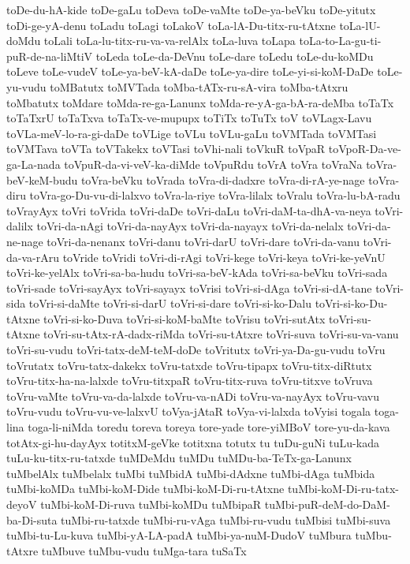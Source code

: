 {toDe-du-hA-kide
toDe-gaLu
toDeva
toDe-vaMte
toDe-ya-beVku
toDe-yitutx
toDi-ge-yA-denu
toLadu
toLagi
toLakoV
toLa-lA-Du-titx-ru-tAtxne
toLa-lU-doMdu
toLali
toLa-lu-titx-ru-va-va-relAlx
toLa-luva
toLapa
toLa-to-La-gu-ti-puR-de-na-liMtiV
toLeda
toLe-da-DeVnu
toLe-dare
toLedu
toLe-du-koMDu
toLeve
toLe-vudeV
toLe-ya-beV-kA-daDe
toLe-ya-dire
toLe-yi-si-koM-DaDe
toLe-yu-vudu
toMBatutx
toMVTada
toMba-tATx-ru-sA-vira
toMba-tAtxru
toMbatutx
toMdare
toMda-re-ga-Lanunx
toMda-re-yA-ga-bA-ra-deMba
toTaTx
toTaTxrU
toTaTxva
toTaTx-ve-mupupx
toTiTx
toTuTx
toV
toVLagx-Lavu
toVLa-meV-lo-ra-gi-daDe
toVLige
toVLu
toVLu-gaLu
toVMTada
toVMTasi
toVMTava
toVTa
toVTakekx
toVTasi
toVhi-nali
toVkuR
toVpaR
toVpoR-Da-ve-ga-La-nada
toVpuR-da-vi-veV-ka-diMde
toVpuRdu
toVrA
toVra
toVraNa
toVra-beV-keM-budu
toVra-beVku
toVrada
toVra-di-dadxre
toVra-di-rA-ye-nage
toVra-diru
toVra-go-Du-vu-di-lalxvo
toVra-la-riye
toVra-lilalx
toVralu
toVra-lu-bA-radu
toVrayAyx
toVri
toVrida
toVri-daDe
toVri-daLu
toVri-daM-ta-dhA-va-neya
toVri-dalilx
toVri-da-nAgi
toVri-da-nayAyx
toVri-da-nayayx
toVri-da-nelalx
toVri-da-ne-nage
toVri-da-nenanx
toVri-danu
toVri-darU
toVri-dare
toVri-da-vanu
toVri-da-va-rAru
toVride
toVridi
toVri-di-rAgi
toVri-kege
toVri-keya
toVri-ke-yeVnU
toVri-ke-yelAlx
toVri-sa-ba-hudu
toVri-sa-beV-kAda
toVri-sa-beVku
toVri-sada
toVri-sade
toVri-sayAyx
toVri-sayayx
toVrisi
toVri-si-dAga
toVri-si-dA-tane
toVri-sida
toVri-si-daMte
toVri-si-darU
toVri-si-dare
toVri-si-ko-Dalu
toVri-si-ko-Du-tAtxne
toVri-si-ko-Duva
toVri-si-koM-baMte
toVrisu
toVri-sutAtx
toVri-su-tAtxne
toVri-su-tAtx-rA-dadx-riMda
toVri-su-tAtxre
toVri-suva
toVri-su-va-vanu
toVri-su-vudu
toVri-tatx-deM-teM-doDe
toVritutx
toVri-ya-Da-gu-vudu
toVru
toVrutatx
toVru-tatx-dakekx
toVru-tatxde
toVru-tipapx
toVru-titx-diRtutx
toVru-titx-ha-na-lalxde
toVru-titxpaR
toVru-titx-ruva
toVru-titxve
toVruva
toVru-vaMte
toVru-va-da-lalxde
toVru-va-nADi
toVru-va-nayAyx
toVru-vavu
toVru-vudu
toVru-vu-ve-lalxvU
toVya-jAtaR
toVya-vi-lalxda
toVyisi
togala
toga-lina
toga-li-niMda
toredu
toreva
toreya
tore-yade
tore-yiMBoV
tore-yu-da-kava
totAtx-gi-hu-dayAyx
totitxM-geVke
totitxna
totutx
tu
tuDu-guNi
tuLu-kada
tuLu-ku-titx-ru-tatxde
tuMDeMdu
tuMDu
tuMDu-ba-TeTx-ga-Lanunx
tuMbelAlx
tuMbelalx
tuMbi
tuMbidA
tuMbi-dAdxne
tuMbi-dAga
tuMbida
tuMbi-koMDa
tuMbi-koM-Dide
tuMbi-koM-Di-ru-tAtxne
tuMbi-koM-Di-ru-tatx-deyoV
tuMbi-koM-Di-ruva
tuMbi-koMDu
tuMbipaR
tuMbi-puR-deM-do-DaM-ba-Di-suta
tuMbi-ru-tatxde
tuMbi-ru-vAga
tuMbi-ru-vudu
tuMbisi
tuMbi-suva
tuMbi-tu-Lu-kuva
tuMbi-yA-LA-padA
tuMbi-ya-nuM-DudoV
tuMbura
tuMbu-tAtxre
tuMbuve
tuMbu-vudu
tuMga-tara
tuSaTx
}
